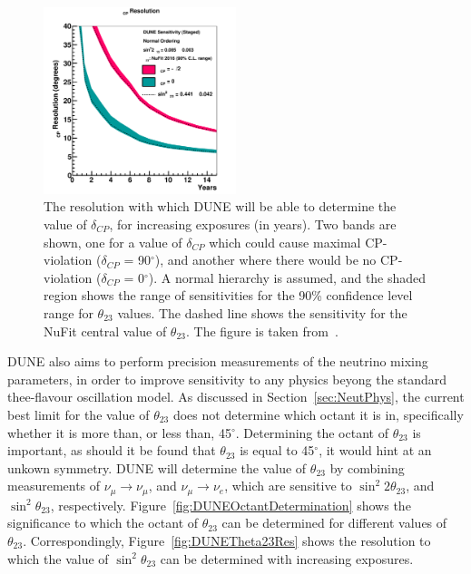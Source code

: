 \begin{figure}
  \centering
  \includegraphics[width=0.5\textwidth]{resdcp_exp_staging_th23band_2017}
  \caption[The resolution with which DUNE will be able to determine the value of $\delta_{CP}$, for increasing exposures]
          {The resolution with which DUNE will be able to determine the value of $\delta_{CP}$, for increasing exposures (in years). Two bands are shown, one for a value of $\delta_{CP}$ which could cause maximal CP-violation ($\delta_{CP}$ = 90$^{\circ}$), and another where there would be no CP-violation ($\delta_{CP}$ = 0$^{\circ}$). A normal hierarchy is assumed, and the shaded region shows the range of sensitivities for the 90\% confidence level range for $\theta_{23}$ values. The dashed line shows the sensitivity for the NuFit central value of $\theta_{23}$. The figure is taken from~\citep{DUNE2377}.}
  \label{fig:DUNECPViolationRes}
\end{figure}

DUNE also aims to perform precision measurements of the neutrino mixing parameters, in order to improve sensitivity to any physics beyong the standard thee-flavour oscillation model. As discussed in Section~\ref{sec:NeutPhys}, the current best limit for the value of $\theta_{23}$ does not determine which octant it is in, specifically whether it is more than, or less than, 45$^{\circ}$. Determining the octant of $\theta_{23}$ is important, as should it be found that $\theta_{23}$ is equal to 45$^{\circ}$, it would hint at an unkown symmetry. DUNE will determine the value of $\theta_{23}$ by combining measurements of $\nu_{\mu} \rightarrow \nu_{\mu}$, and $\nu_{\mu} \rightarrow \nu_{e}$, which are sensitive to $\sin^{2}2\theta_{23}$, and $\sin^2\theta_{23}$, respectively. Figure~\ref{fig:DUNEOctantDetermination} shows the significance to which the octant of $\theta_{23}$ can be determined for different values of $\theta_{23}$. Correspondingly, Figure~\ref{fig:DUNETheta23Res} shows the resolution to which the value of $\sin^{2}\theta_{23}$ can be determined with increasing exposures. \\

